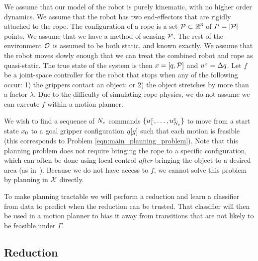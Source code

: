 We assume that our model of the robot is purely kinematic, with no higher order dynamics. We assume that the robot has two end-effectors that are rigidly attached to the rope. The configuration of a rope is a set $\mathcal{P} \subset \mathbb{R}^3$ of $P = | \mathcal{P} |$ points. We assume that we have a method of sensing $\mathcal{P}$. The rest of the environment $\mathcal{O}$ is assumed to be both static, and known exactly. We assume that the robot moves slowly enough that we can treat the combined robot and rope as quasi-static. The true state of the system is then $x = [q,\mathcal{P}]$ and $u^x = \Delta q$. Let $f$ be a joint-space controller for the robot that stops when any of the following occur: 1) the grippers contact an object; or 2) the object stretches by more than a factor $\lambda$. Due to the difficulty of simulating rope physics, we do not assume we can execute $f$ within a motion planner.

We wish to find a sequence of $N_e$ commands $\{u^x_1, \dots, u^x_{N_e} \}$ to move from a start state $x_0$ to a goal gripper configuration $q[g]$ such that each motion is feasible (this corresponds to Problem \eqref{eqn:main_planning_problem}). Note that this planning problem does not require bringing the rope to a specific configuration, which can often be done using local control \textit{after} bringing the object to a desired area (as in~\cite{McConachie2020}). %
Because we do not have access to $f$, we cannot solve this problem by planning in $\mathcal{X}$ directly.





To make planning tractable we will perform a reduction and learn a classifier from data to predict when the reduction can be trusted. That classifier will then be used in a motion planner to bias it away from transitions that are not likely to be feasible under $\Gamma$.


\subsection{Reduction}

\label{sec:isrr_model_approx}


